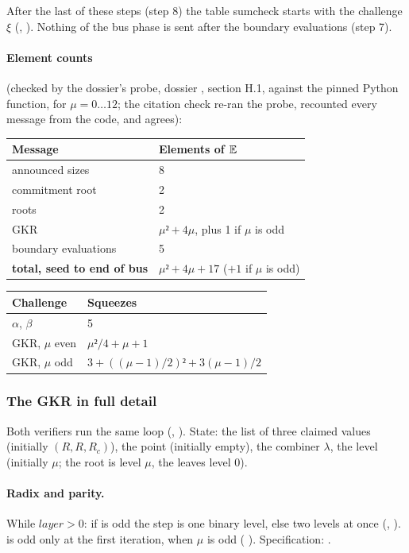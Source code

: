 After the last of these steps (step 8) the table sumcheck starts with the challenge $ξ$
(, ). Nothing of the bus phase is sent after the boundary
evaluations (step 7).

\paragraph{Element counts} (checked by the dossier's probe, dossier , section
H.1, against the pinned Python function, for $μ = 0 … 12$; the citation check re-ran the probe,
recounted every message from the code, and agrees):

\begin{center}\small
\begin{tabular}{@{}ll@{}}
\toprule
Message & Elements of $\mathbb{E}$ \\
\midrule
announced sizes & 8 \\
commitment root & 2 \\
roots & 2 \\
GKR & $μ² + 4μ$, plus 1 if $μ$ is odd \\
boundary evaluations & 5 \\
\textbf{total, seed to end of bus} & $μ² + 4μ + 17$ ($+1$ if $μ$ is odd) \\
\bottomrule
\end{tabular}
\qquad
\begin{tabular}{@{}ll@{}}
\toprule
Challenge & Squeezes \\
\midrule
$α$, $β$ & 5 \\
GKR, $μ$ even & $μ²/4 + μ + 1$ \\
GKR, $μ$ odd & $3 + ((μ−1)/2)² + 3(μ−1)/2$ \\
\bottomrule
\end{tabular}
\end{center}

\subsubsection{The GKR in full detail}\label{sec:gen-bus-gkr}

Both verifiers run the same loop (, ). State: the list
 of three claimed values (initially $(R, R, R_c)$), the point 
(initially empty), the combiner $λ$, the level  (initially $μ$; the root is level
$μ$, the leaves level 0).

\begin{sloppypar}
\paragraph{Radix and parity.} While $\mathit{layer} > 0$: if  is odd the step is one
binary level, else two levels at once (, ).  is odd
only at the first iteration, when $μ$ is odd (
).
Specification: .
\end{sloppypar}

